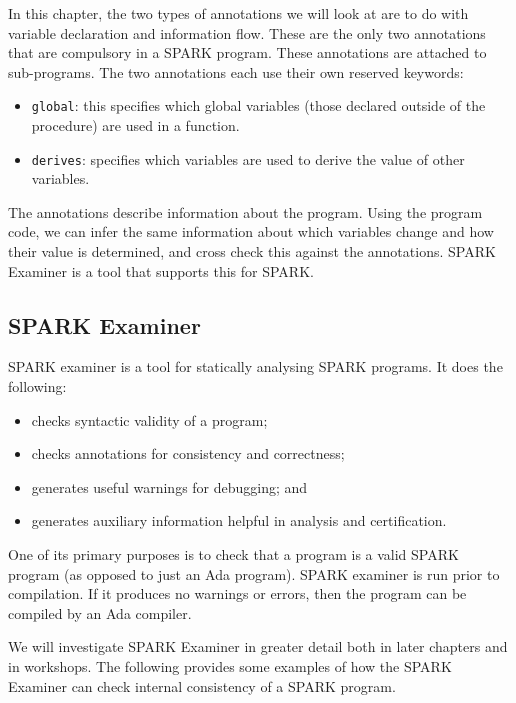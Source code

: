 In this chapter, the two types of annotations we will look at are to do with variable declaration and information flow. These are the only two annotations that are compulsory in a SPARK program. These annotations are attached to sub-programs. The two annotations each use their own reserved keywords:

\begin{itemize}
 \item \texttt{global}: this specifies which global variables (those declared outside of the procedure) are used in a function.
 \item \texttt{derives}: specifies which variables are used to derive the value of other variables.
\end{itemize}

The annotations describe information about the program. Using the program code, we can infer the same information about which variables change and how their value is determined, and cross check this against the annotations. SPARK Examiner is a tool that supports this for SPARK.

\subsection{SPARK Examiner}


SPARK examiner is a tool for statically analysing SPARK programs. It does the following:

\begin{itemize}

 \item checks syntactic validity of a program;

 \item checks annotations for consistency and correctness; 

 \item generates useful warnings for debugging; and

 \item generates auxiliary information helpful in analysis and certification.

\end{itemize}

One of its primary purposes is to check that a program is a valid SPARK program (as opposed to just an Ada program).  SPARK examiner is run prior to compilation. If it produces no warnings or errors, then the program can be compiled by an Ada compiler.

We will investigate SPARK Examiner in greater detail both in later chapters and in workshops. The following provides some examples of how the SPARK Examiner can check internal consistency of a SPARK program.

